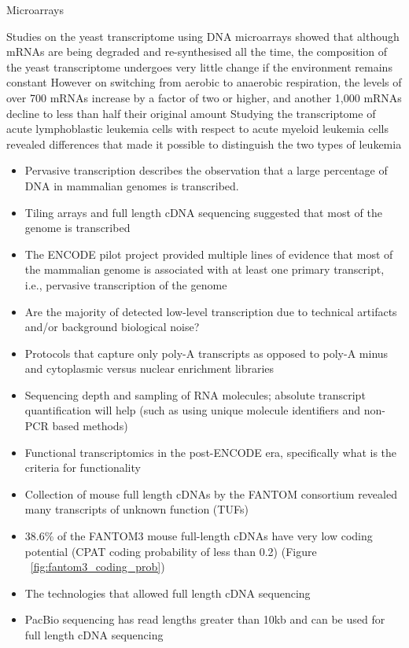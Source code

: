 Microarrays\cite{pmid7569999}

Studies on the yeast transcriptome using DNA microarrays showed that although mRNAs are being degraded and re-synthesised all the time, the composition of the yeast transcriptome undergoes very little change if the environment remains constant\cite{pmid9381177}
However on switching from aerobic to anaerobic respiration, the levels of over 700 mRNAs increase by a factor of two or higher, and another 1,000 mRNAs decline to less than half their original amount
Studying the transcriptome of acute lymphoblastic leukemia cells with respect to acute myeloid leukemia cells revealed differences that made it possible to distinguish the two types of leukemia

\begin{itemize}
   \item Pervasive transcription describes the observation that a large percentage of DNA in mammalian genomes is transcribed.
   \item Tiling arrays and full length cDNA sequencing suggested that most of the genome is transcribed
   \item The ENCODE pilot project provided multiple lines of evidence that most of the mammalian genome is associated with at least one primary transcript, i.e., pervasive transcription of the genome
   \item Are the majority of detected low-level transcription due to technical artifacts and/or background biological noise?
   \item Protocols that capture only poly-A transcripts as opposed to poly-A minus and cytoplasmic versus nuclear enrichment libraries
   \item Sequencing depth and sampling of RNA molecules; absolute transcript quantification will help (such as using unique molecule identifiers and non-PCR based methods)
   \item Functional transcriptomics in the post-ENCODE era, specifically what is the criteria for functionality
   \item Collection of mouse full length cDNAs by the FANTOM consortium revealed many transcripts of unknown function (TUFs)
   \item 38.6\% of the FANTOM3 mouse full-length cDNAs have very low coding potential (CPAT coding probability of less than 0.2) (Figure ~\ref{fig:fantom3_coding_prob})
   \item The technologies that allowed full length cDNA sequencing
   \item PacBio sequencing has read lengths greater than 10kb and can be used for full length cDNA sequencing

\end{itemize}

